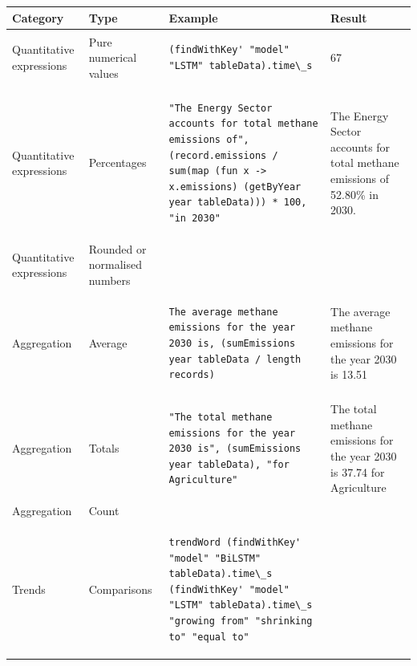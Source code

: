 \begin{table}[!ht]
   \centering
   \tiny
   \renewcommand{\arraystretch}{1.5}
   \begin{tabular}{p{1.5cm}p{1.5cm}p{5cm}p{4cm}}
      \toprule
      \textbf{Category} & \textbf{Type} & \textbf{Example} & \textbf{Result} \\
      \midrule
      \rowcolor{green!20}
      Quantitative expressions & Pure numerical values &
      \begin{lstlisting}[language=Fluid]
            (findWithKey' "model" "LSTM" tableData).time\_s
      \end{lstlisting}
      & 67 \\
      \rowcolor{green!20}
      Quantitative expressions & Percentages &
      \begin{lstlisting}[language=Fluid]
         "The Energy Sector accounts for total methane emissions of", (record.emissions / sum(map (fun x -> x.emissions) (getByYear year tableData))) * 100, "in 2030"
      \end{lstlisting} &
      The Energy Sector accounts for total methane emissions of 52.80\% in 2030.\\
      \rowcolor{green!20}
      Quantitative expressions & Rounded or normalised numbers & ~ & ~ \\
      \rowcolor{green!20}
      Aggregation & Average &
      \begin{lstlisting}[language=Fluid]
         The average methane emissions for the year 2030 is, (sumEmissions year tableData / length records)
      \end{lstlisting}
      & The average methane emissions for the year 2030 is 13.51 \\
      \rowcolor{green!20}
      Aggregation & Totals &
      \begin{lstlisting}[language=Fluid]
         "The total methane emissions for the year 2030 is", (sumEmissions year tableData), "for Agriculture"
      \end{lstlisting} &
      The total methane emissions for the year 2030 is 37.74 for Agriculture \\
      Aggregation & Count &  ~ & ~ \\
      \rowcolor{green!20}
      Trends & Comparisons &
      \begin{lstlisting}[language=Fluid]
         trendWord (findWithKey' "model" "BiLSTM" tableData).time\_s (findWithKey' "model" "LSTM" tableData).time\_s "growing from" "shrinking to" "equal to"
      \end{lstlisting}

\end{tabular}
\end{table}
